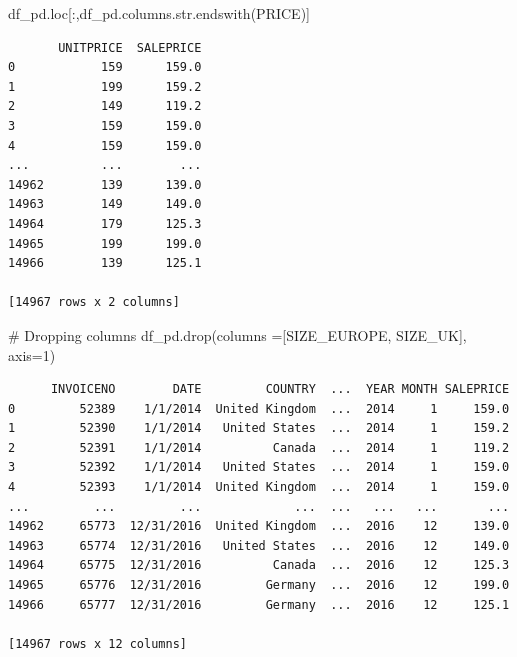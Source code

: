 \documentclass[
  letterpaper,
  DIV=11,
  numbers=noendperiod]{scrreprt}
\newenvironment{Shaded}{\begin{snugshade}}{\end{snugshade}}
\newcommand{\BuiltInTok}[1]{\textcolor[rgb]{0.00,0.23,0.31}{#1}}
\newcommand{\CommentTok}[1]{\textcolor[rgb]{0.37,0.37,0.37}{#1}}
\newcommand{\DecValTok}[1]{\textcolor[rgb]{0.68,0.00,0.00}{#1}}
\newcommand{\NormalTok}[1]{\textcolor[rgb]{0.00,0.23,0.31}{#1}}
\newcommand{\OperatorTok}[1]{\textcolor[rgb]{0.37,0.37,0.37}{#1}}
\newcommand{\StringTok}[1]{\textcolor[rgb]{0.13,0.47,0.30}{#1}}
\begin{document}
\begin{Shaded}
\begin{Highlighting}[]
\NormalTok{df\_pd.loc[:,df\_pd.columns.}\BuiltInTok{str}\NormalTok{.endswith(}\StringTok{\textquotesingle{}PRICE\textquotesingle{}}\NormalTok{)]}
\end{Highlighting}
\end{Shaded}

\begin{verbatim}
       UNITPRICE  SALEPRICE
0            159      159.0
1            199      159.2
2            149      119.2
3            159      159.0
4            159      159.0
...          ...        ...
14962        139      139.0
14963        149      149.0
14964        179      125.3
14965        199      199.0
14966        139      125.1

[14967 rows x 2 columns]
\end{verbatim}

\begin{Shaded}
\begin{Highlighting}[]
\CommentTok{\# Dropping columns }
\NormalTok{df\_pd.drop(columns }\OperatorTok{=}\NormalTok{[}\StringTok{\textquotesingle{}SIZE\_EUROPE\textquotesingle{}}\NormalTok{, }\StringTok{\textquotesingle{}SIZE\_UK\textquotesingle{}}\NormalTok{], axis}\OperatorTok{=}\DecValTok{1}\NormalTok{)}
\end{Highlighting}
\end{Shaded}

\begin{verbatim}
      INVOICENO        DATE         COUNTRY  ...  YEAR MONTH SALEPRICE
0         52389    1/1/2014  United Kingdom  ...  2014     1     159.0
1         52390    1/1/2014   United States  ...  2014     1     159.2
2         52391    1/1/2014          Canada  ...  2014     1     119.2
3         52392    1/1/2014   United States  ...  2014     1     159.0
4         52393    1/1/2014  United Kingdom  ...  2014     1     159.0
...         ...         ...             ...  ...   ...   ...       ...
14962     65773  12/31/2016  United Kingdom  ...  2016    12     139.0
14963     65774  12/31/2016   United States  ...  2016    12     149.0
14964     65775  12/31/2016          Canada  ...  2016    12     125.3
14965     65776  12/31/2016         Germany  ...  2016    12     199.0
14966     65777  12/31/2016         Germany  ...  2016    12     125.1

[14967 rows x 12 columns]
\end{verbatim}
\end{document}
